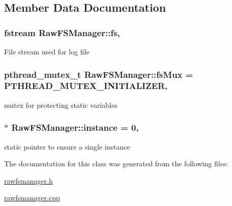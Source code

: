 \subsection{Member Data Documentation}
\hypertarget{classit_1_1testbench_1_1ioutil_1_1RawFSManager_a413121e26e9462f50b44d9709ab41914}{
\subsubsection[{fs}]{\setlength{\rightskip}{0pt plus 5cm}fstream Raw\-F\-S\-Manager\-::fs\hspace{0.3cm}{\ttfamily [static]}, {\ttfamily [private]}}}\label{d0/d54/classit_1_1testbench_1_1ioutil_1_1RawFSManager_a413121e26e9462f50b44d9709ab41914}
File stream used for log file \hypertarget{classit_1_1testbench_1_1ioutil_1_1RawFSManager_a3011d242d4bdc600bad7d57f94801e73}{
\subsubsection[{fs\-Mux}]{\setlength{\rightskip}{0pt plus 5cm}pthread\-\_\-mutex\-\_\-t Raw\-F\-S\-Manager\-::fs\-Mux = P\-T\-H\-R\-E\-A\-D\-\_\-\-M\-U\-T\-E\-X\-\_\-\-I\-N\-I\-T\-I\-A\-L\-I\-Z\-E\-R\hspace{0.3cm}{\ttfamily [static]}, {\ttfamily [private]}}}\label{d0/d54/classit_1_1testbench_1_1ioutil_1_1RawFSManager_a3011d242d4bdc600bad7d57f94801e73}
mutex for protecting static variables \hypertarget{classit_1_1testbench_1_1ioutil_1_1RawFSManager_a80c0fcfb712921e4f05703ce1ecf99f2}{
\subsubsection[{instance}]{ $\ast$ Raw\-F\-S\-Manager\-::instance = 0\hspace{0.3cm}{\ttfamily [static]}, {\ttfamily [private]}}}\label{d0/d54/classit_1_1testbench_1_1ioutil_1_1RawFSManager_a80c0fcfb712921e4f05703ce1ecf99f2}
static pointer to ensure a single instance 

The documentation for this class was generated from the following files\-:\begin{DoxyCompactItemize}
\item 
\hyperlink{rawfsmanager_8h}{rawfsmanager.\-h}\item 
\hyperlink{rawfsmanager_8cpp}{rawfsmanager.\-cpp}\end{DoxyCompactItemize}
